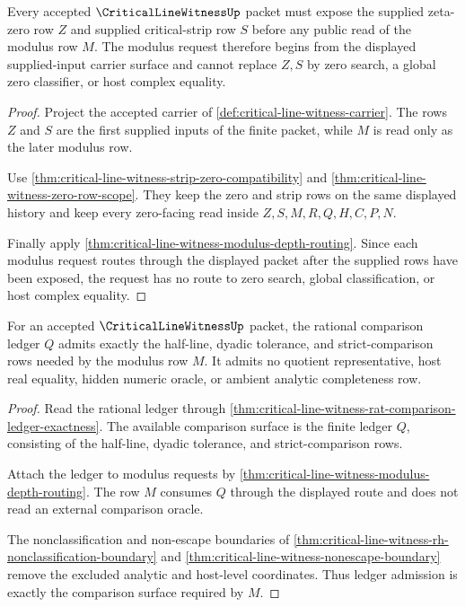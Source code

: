 \begin{theorem}
\label{thm:critical-line-witness-supplied-input-carrier-row}
Every accepted $\CriticalLineWitnessUp$ packet must expose the supplied zeta-zero row $Z$ and supplied critical-strip row $S$ before any public read of the modulus row $M$. The modulus request therefore begins from the displayed supplied-input carrier surface and cannot replace $Z,S$ by zero search, a global zero classifier, or host complex equality.
\end{theorem}
\begin{proof}
Project the accepted carrier of \autoref{def:critical-line-witness-carrier}. The rows $Z$ and $S$ are the first supplied inputs of the finite packet, while $M$ is read only as the later modulus row.

Use \autoref{thm:critical-line-witness-strip-zero-compatibility} and \autoref{thm:critical-line-witness-zero-row-scope}. They keep the zero and strip rows on the same displayed history and keep every zero-facing read inside $Z,S,M,R,Q,H,C,P,N$.

Finally apply \autoref{thm:critical-line-witness-modulus-depth-routing}. Since each modulus request routes through the displayed packet after the supplied rows have been exposed, the request has no route to zero search, global classification, or host complex equality.
\end{proof}

\begin{theorem}
\label{thm:critical-line-witness-comparison-ledger-admission}
For an accepted $\CriticalLineWitnessUp$ packet, the rational comparison ledger $Q$ admits exactly the half-line, dyadic tolerance, and strict-comparison rows needed by the modulus row $M$. It admits no quotient representative, host real equality, hidden numeric oracle, or ambient analytic completeness row.
\end{theorem}
\begin{proof}
Read the rational ledger through \autoref{thm:critical-line-witness-rat-comparison-ledger-exactness}. The available comparison surface is the finite ledger $Q$, consisting of the half-line, dyadic tolerance, and strict-comparison rows.

Attach the ledger to modulus requests by \autoref{thm:critical-line-witness-modulus-depth-routing}. The row $M$ consumes $Q$ through the displayed route and does not read an external comparison oracle.

The nonclassification and non-escape boundaries of \autoref{thm:critical-line-witness-rh-nonclassification-boundary} and \autoref{thm:critical-line-witness-nonescape-boundary} remove the excluded analytic and host-level coordinates. Thus ledger admission is exactly the comparison surface required by $M$.
\end{proof}

